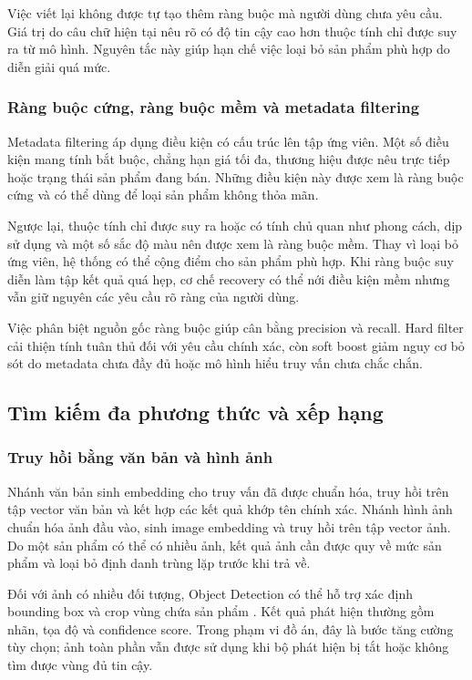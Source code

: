 Việc viết lại không được tự tạo thêm ràng buộc mà người dùng chưa yêu cầu. Giá trị do câu chữ hiện tại nêu rõ có độ tin cậy cao hơn thuộc tính chỉ được suy ra từ mô hình. Nguyên tắc này giúp hạn chế việc loại bỏ sản phẩm phù hợp do diễn giải quá mức.

\subsubsection{Ràng buộc cứng, ràng buộc mềm và metadata filtering}

Metadata filtering áp dụng điều kiện có cấu trúc lên tập ứng viên. Một số điều kiện mang tính bắt buộc, chẳng hạn giá tối đa, thương hiệu được nêu trực tiếp hoặc trạng thái sản phẩm đang bán. Những điều kiện này được xem là ràng buộc cứng và có thể dùng để loại sản phẩm không thỏa mãn.

Ngược lại, thuộc tính chỉ được suy ra hoặc có tính chủ quan như phong cách, dịp sử dụng và một số sắc độ màu nên được xem là ràng buộc mềm. Thay vì loại bỏ ứng viên, hệ thống có thể cộng điểm cho sản phẩm phù hợp. Khi ràng buộc suy diễn làm tập kết quả quá hẹp, cơ chế recovery có thể nới điều kiện mềm nhưng vẫn giữ nguyên các yêu cầu rõ ràng của người dùng.

Việc phân biệt nguồn gốc ràng buộc giúp cân bằng precision và recall. Hard filter cải thiện tính tuân thủ đối với yêu cầu chính xác, còn soft boost giảm nguy cơ bỏ sót do metadata chưa đầy đủ hoặc mô hình hiểu truy vấn chưa chắc chắn.

\subsection{Tìm kiếm đa phương thức và xếp hạng}

\subsubsection{Truy hồi bằng văn bản và hình ảnh}

Nhánh văn bản sinh embedding cho truy vấn đã được chuẩn hóa, truy hồi trên tập vector văn bản và kết hợp các kết quả khớp tên chính xác. Nhánh hình ảnh chuẩn hóa ảnh đầu vào, sinh image embedding và truy hồi trên tập vector ảnh. Do một sản phẩm có thể có nhiều ảnh, kết quả ảnh cần được quy về mức sản phẩm và loại bỏ định danh trùng lặp trước khi trả về.

Đối với ảnh có nhiều đối tượng, Object Detection có thể hỗ trợ xác định bounding box và crop vùng chứa sản phẩm \parencite{redmon2016yolo}. Kết quả phát hiện thường gồm nhãn, tọa độ và confidence score. Trong phạm vi đồ án, đây là bước tăng cường tùy chọn; ảnh toàn phần vẫn được sử dụng khi bộ phát hiện bị tắt hoặc không tìm được vùng đủ tin cậy.

